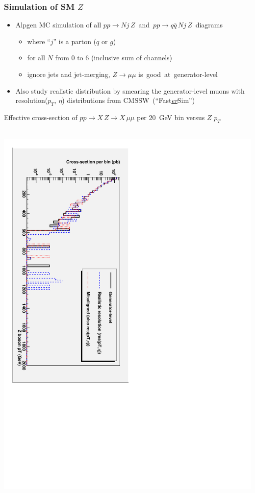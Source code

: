 \documentclass[compress]{beamer}
\begin{document}
\begin{frame}
\frametitle{Simulation of SM $Z$}
\begin{itemize}
\item Alpgen MC simulation of all \mbox{$pp \to N j \, Z$ and $pp \to q\bar{q} \, N j \, Z$ diagrams\hspace{-1 cm}}
\begin{itemize}
\item where ``$j$'' is a parton ($q$ or $g$)
\item for all $N$ from 0 to 6 (inclusive sum of channels)
\item ignore jets and jet-merging, $Z \to \mu\mu$ \mbox{is good at generator-level\hspace{-1 cm}}
\end{itemize}

\item Also study realistic distribution by smearing the generator-level muons with resolution($p_T$, $\eta$) distributions from \mbox{CMSSW (``Fast{\it \underline{er}}Sim'')\hspace{-1 cm}}
\end{itemize}

Effective cross-section of $pp \to X \, Z \to X \, \mu\mu$ per 20~GeV bin versus $Z$ $p_T$

\vspace{0.15 cm}
\mbox{ } \hfill \includegraphics[height=0.9\linewidth, angle=90]{insensitivity_to_misalignment.pdf} \hfill \mbox{ }
\end{frame}
\end{document}
